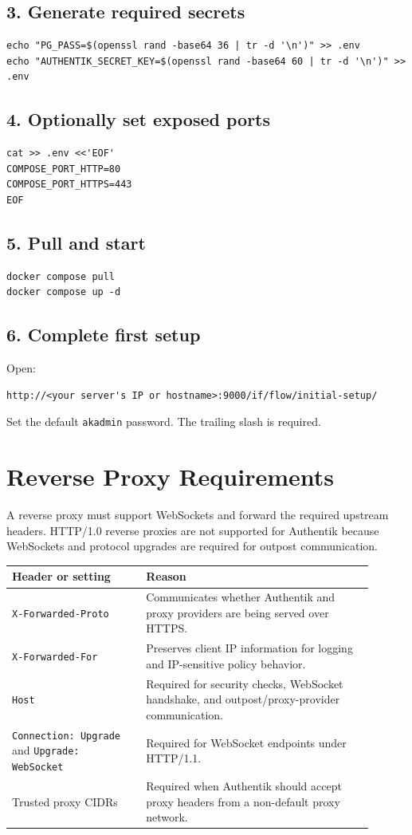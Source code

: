 \documentclass[11pt]{article}
\begin{document}
\subsection*{3. Generate required secrets}
\begin{verbatim}
echo "PG_PASS=$(openssl rand -base64 36 | tr -d '\n')" >> .env
echo "AUTHENTIK_SECRET_KEY=$(openssl rand -base64 60 | tr -d '\n')" >> .env
\end{verbatim}

\subsection*{4. Optionally set exposed ports}
\begin{verbatim}
cat >> .env <<'EOF'
COMPOSE_PORT_HTTP=80
COMPOSE_PORT_HTTPS=443
EOF
\end{verbatim}

\subsection*{5. Pull and start}
\begin{verbatim}
docker compose pull
docker compose up -d
\end{verbatim}

\subsection*{6. Complete first setup}
Open:
\begin{verbatim}
http://<your server's IP or hostname>:9000/if/flow/initial-setup/
\end{verbatim}
Set the default \texttt{akadmin} password. The trailing slash is required.

\section*{Reverse Proxy Requirements}
A reverse proxy must support WebSockets and forward the required upstream headers. HTTP/1.0 reverse proxies are not supported for Authentik because WebSockets and protocol upgrades are required for outpost communication.

\begin{longtable}{>{\raggedright\arraybackslash}p{0.33\linewidth}>{\raggedright\arraybackslash}p{0.57\linewidth}}
\textbf{Header or setting} & \textbf{Reason} \\
\hline
\texttt{X-Forwarded-Proto} & Communicates whether Authentik and proxy providers are being served over HTTPS. \\
\texttt{X-Forwarded-For} & Preserves client IP information for logging and IP-sensitive policy behavior. \\
\texttt{Host} & Required for security checks, WebSocket handshake, and outpost/proxy-provider communication. \\
\texttt{Connection: Upgrade} and \texttt{Upgrade: WebSocket} & Required for WebSocket endpoints under HTTP/1.1. \\
Trusted proxy CIDRs & Required when Authentik should accept proxy headers from a non-default proxy network. \\
\end{longtable}
\end{document}
